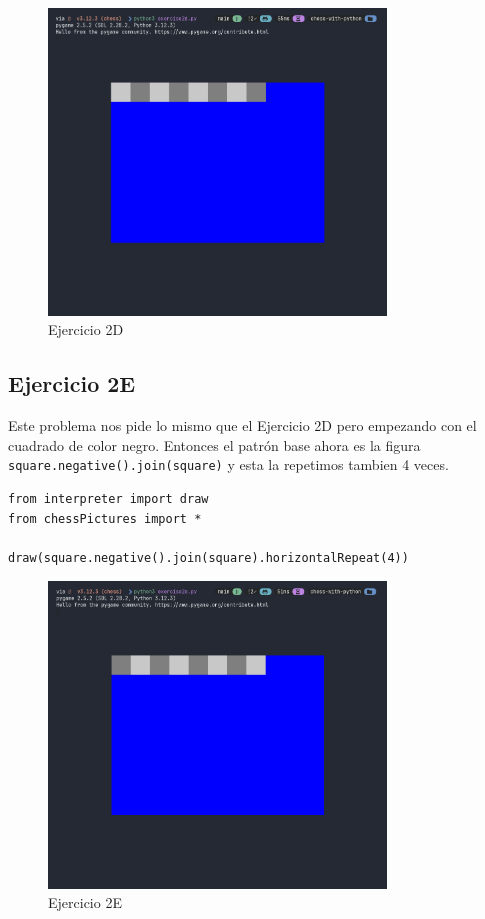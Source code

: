 \documentclass[10pt, a4paper]{article}
\newcommand{\mintpython}[1]{\texttt{#1}}
\begin{document}
\begin{figure}[H]
  \centering
  \includegraphics[width=0.8\textwidth]{img/exercise2d.png}
  \caption{Ejercicio 2D}
\end{figure}

\subsection{Ejercicio 2E}
Este problema nos pide lo mismo que el Ejercicio 2D pero empezando con el cuadrado de color negro. Entonces el patrón base ahora es la figura \mintpython{square.negative().join(square)} y esta la repetimos tambien 4 veces.

\begin{verbatim}
from interpreter import draw
from chessPictures import *

draw(square.negative().join(square).horizontalRepeat(4))
\end{verbatim}

\begin{figure}[H]
  \centering
  \includegraphics[width=0.8\textwidth]{img/exercise2e.png}
  \caption{Ejercicio 2E}
\end{figure}
\end{document}
